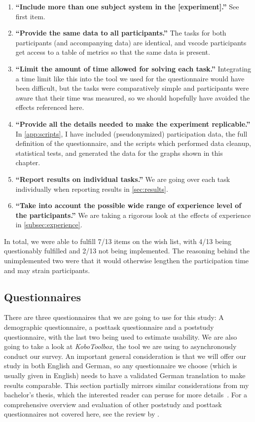 \documentclass[../thesis]{subfiles}
\begin{document}
\begin{enumerate}
	\item \textbf{\enquote{Include more than one subject system in the [experiment].}}
	      See first item. \cyes
	\item \textbf{\enquote{Provide the same data to all participants.}}
	      The tasks for both participants (and accompanying data) are identical, and \gls{vscode} participants get access to a table of metrics so that the same data is present. \cyes
	\item \textbf{\enquote{Limit the amount of time allowed for solving each task.}}
	      Integrating a time limit like this into the tool we used for the questionnaire would have been difficult, but the tasks were comparatively simple and participants were aware that their time was measured, so we should hopefully have avoided the effects referenced here.~\chmm
	\item \textbf{\enquote{Provide all the details needed to make the experiment replicable.}}
	      In \cref{app:scripts}, I have included (pseudonymized) participation data, the full definition of the questionnaire, and the scripts which performed data cleanup, statistical tests, and generated the data for the graphs shown in this chapter.~\cyes
	\item \textbf{\enquote{Report results on individual tasks.}}
	      We are going over each task individually when reporting results in \cref{sec:results}. \cyes
	\item \textbf{\enquote{Take into account the possible wide range of experience level of the participants.}}
	      We are taking a rigorous look at the effects of experience in \cref{subsec:experience}. \cyes
\end{enumerate}

In total, we were able to fulfill 7/13 items on the wish list, with 4/13 being questionably fulfilled and 2/13 not being implemented.
The reasoning behind the unimplemented two were that it would otherwise lengthen the participation time and may strain participants.

\subsection{Questionnaires}\label{subsec:question}
There are three questionnaires that we are going to use for this study:
A demographic questionnaire, a \gls{posttask} questionnaire and a \gls{poststudy} questionnaire, with the last two being used to estimate usability.
We are also going to take a look at \emph{KoboToolbox}, the tool we are using to asynchronously conduct our survey.
An important general consideration is that we will offer our study in both English and German, so any questionnaire we choose (which is usually given in English) needs to have a validated German translation to make results comparable.
This section partially mirrors similar considerations from my bachelor's thesis, which the interested reader can peruse for more details~\cite[35 \psqq]{galperin2021}.
For a comprehensive overview and evaluation of other \gls{poststudy} and \gls{posttask} questionnaires not covered here, see the review by \textcite{hodrien2021}.
\end{document}
